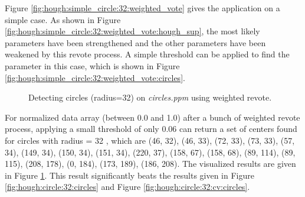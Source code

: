 \documentclass[paper=a4, fontsize=11pt]{scrartcl}
\begin{document}
Figure \ref{fig:hough:simple_circle:32:weighted_vote} gives the application on a simple case. 
As shown in Figure \ref{fig:hough:simple_circle:32:weighted_vote:hough_sup}, the most likely parameters have been strengthened and the other parameters have been weakened by this revote process.
A simple threshold can be applied to find the parameter in this case, which is shown in Figure \ref{fig:hough:simple_circle:32:weighted_vote:circles}.

\begin{figure}[h]
\centering
{}
\caption{Detecting circles (radius=32) on \emph{circles.ppm} using weighted revote.}
\label{fig:hough:circle:32:weighted_vote}
\end{figure}

For normalized data array (between 0.0 and 1.0) after a bunch of weighted revote process, applying a small threshold of only $ 0.06 $ can return a set of centers found for circles with radius = 32 , which are (46, 32), (46, 33), (72, 33), (73, 33), (57, 34), (149, 34), (150, 34), (151, 34), (220, 37), (158, 67), (158, 68), (89, 114), (89, 115), (208, 178), (0, 184), (173, 189), (186, 208).
The visualized results are given in Figure \ref{fig:hough:circle:32:weighted_vote}.
This result significantly beats the results given in Figure \ref{fig:hough:circle:32:circles} and Figure \ref{fig:hough:circle:32:cv:circles}.
\end{document}
